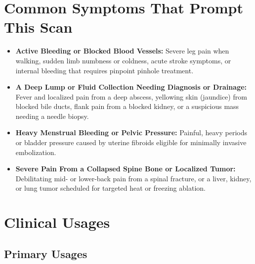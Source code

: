 \section{Common Symptoms That Prompt This Scan}
\begin{itemize}
    \item \textbf{Active Bleeding or Blocked Blood Vessels:} Severe leg pain when walking, sudden limb numbness or coldness, acute stroke symptoms, or internal bleeding that requires pinpoint pinhole treatment.
    \item \textbf{A Deep Lump or Fluid Collection Needing Diagnosis or Drainage:} Fever and localized pain from a deep abscess, yellowing skin (jaundice) from blocked bile ducts, flank pain from a blocked kidney, or a suspicious mass needing a needle biopsy.
    \item \textbf{Heavy Menstrual Bleeding or Pelvic Pressure:} Painful, heavy periods or bladder pressure caused by uterine fibroids eligible for minimally invasive embolization.
    \item \textbf{Severe Pain From a Collapsed Spine Bone or Localized Tumor:} Debilitating mid- or lower-back pain from a spinal fracture, or a liver, kidney, or lung tumor scheduled for targeted heat or freezing ablation.
\end{itemize}

\section{Clinical Usages}

\subsection{Primary Usages}

